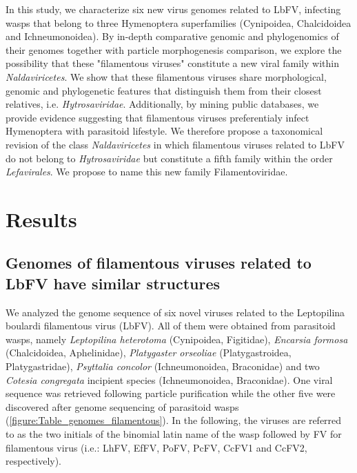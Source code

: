 In this study, we characterize six new virus genomes related to LbFV, infecting wasps that belong to three Hymenoptera superfamilies (Cynipoidea, Chalcidoidea and Ichneumonoidea). By in-depth comparative genomic and phylogenomics of their genomes together with particle morphogenesis comparison, we explore the possibility that these "filamentous viruses" constitute a new viral family within \textit{Naldaviricetes}. We show that these filamentous viruses share morphological, genomic and phylogenetic features that distinguish them from their closest relatives, i.e. \textit{Hytrosaviridae}. Additionally, by mining public databases, we provide evidence suggesting that filamentous viruses preferentialy infect Hymenoptera with parasitoid lifestyle.  We therefore propose a taxonomical revision of the class \textit{Naldaviricetes} in which filamentous viruses related to LbFV do not belong to \textit{Hytrosaviridae} but constitute a fifth family within the order \textit{Lefavirales}. We propose to name this new family Filamentoviridae. 

\section{Results}

\subsection{Genomes of filamentous viruses related to LbFV have similar structures}   

We analyzed the genome sequence of six novel viruses related to the Leptopilina boulardi filamentous virus (LbFV). All of them were obtained from parasitoid wasps, namely \textit{Leptopilina heterotoma} (Cynipoidea, Figitidae), \textit{Encarsia formosa} (Chalcidoidea, Aphelinidae), \textit{Platygaster orseoliae} (Platygastroidea, Platygastridae), \textit{Psyttalia concolor} (Ichneumonoidea, Braconidae) and two \textit{Cotesia congregata} incipient species (Ichneumonoidea, Braconidae). One viral sequence was retrieved following particle purification while the other five were discovered after genome sequencing of parasitoid wasps (\figurename{\ref{figure:Table_genomes_filamentous}}). In the following, the viruses are referred to as the two initials of the binomial latin name of the wasp followed by FV for filamentous virus (i.e.: LhFV, EfFV, PoFV, PcFV, CcFV1 and CcFV2, respectively).  

